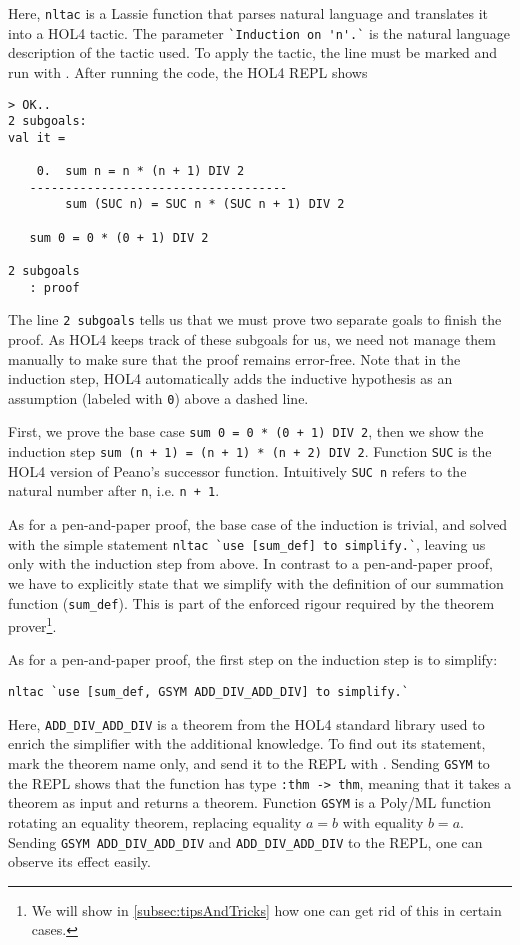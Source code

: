 Here, \lstinline{nltac} is a Lassie function that parses natural language and
translates it into a HOL4 tactic.
The parameter \lstinline{`Induction on 'n'.`} is the natural language
description of the tactic used.
To apply the tactic, the line must be marked and run with .
After running the code, the HOL4 REPL shows
\begin{lstlisting}
> OK..
2 subgoals:
val it =

    0.  sum n = n * (n + 1) DIV 2
   ------------------------------------
        sum (SUC n) = SUC n * (SUC n + 1) DIV 2

   sum 0 = 0 * (0 + 1) DIV 2

2 subgoals
   : proof
\end{lstlisting}

The line \lstinline{2 subgoals} tells us that we must prove two separate goals
to finish the proof.
As HOL4 keeps track of these subgoals for us, we need not manage them manually
to make sure that the proof remains error-free.
Note that in the induction step, HOL4 automatically adds the inductive
hypothesis as an assumption (labeled with \lstinline{0}) above a dashed line.

First, we prove the base case \lstinline{sum 0 = 0 * (0 + 1) DIV 2}, then we
show the induction step \lstinline{sum (n + 1) = (n + 1) * (n + 2) DIV 2}.
Function \lstinline{SUC} is the HOL4 version of Peano's successor function.
Intuitively \lstinline{SUC n} refers to the natural number after \lstinline{n},
i.e. \lstinline{n + 1}.

As for a pen-and-paper proof, the base case of the induction is trivial, and
solved with the simple statement \lstinline{nltac `use [sum_def] to simplify.`},
leaving us only with the induction step from above.
In contrast to a pen-and-paper proof, we have to explicitly state that we
simplify with the definition of our summation function (\lstinline{sum_def}).
This is part of the enforced rigour required by the theorem prover\footnote{
We will show in \autoref{subsec:tipsAndTricks} how one can get rid of this in certain cases.}.

As for a pen-and-paper proof, the first step on the induction step is to
simplify:
\begin{lstlisting}
nltac `use [sum_def, GSYM ADD_DIV_ADD_DIV] to simplify.`
\end{lstlisting}

Here, \lstinline{ADD_DIV_ADD_DIV} is a theorem from the HOL4 standard library
used to enrich the simplifier with the additional knowledge.
To find out its statement, mark the theorem name only, and send it to the
REPL with .
Sending \lstinline{GSYM} to the REPL shows that the function has type
\lstinline{:thm -> thm}, meaning that it takes a theorem as input and returns a
theorem.
Function \lstinline{GSYM} is a Poly/ML function rotating an equality theorem,
replacing equality $a = b$ with equality $b = a$.
Sending \lstinline{GSYM ADD_DIV_ADD_DIV} and \lstinline{ADD_DIV_ADD_DIV} to the REPL, one can
observe its effect easily.

